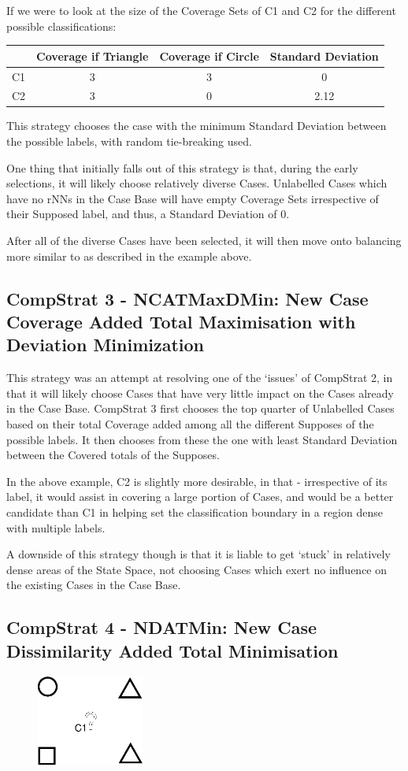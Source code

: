 \documentclass[a4paper,11pt]{report}
\begin{document}
If we were to look at the size of the Coverage Sets of C1 and C2 for the different possible classifications:

\begin{tabular}{|c|c|c|c|}
\cline{2-4} 
\multicolumn{1}{c|}{} & Coverage if Triangle & Coverage if Circle & Standard Deviation\tabularnewline
\hline 
C1 & 3 & 3 & 0\tabularnewline
\hline 
C2 & 3 & 0 & 2.12\tabularnewline
\hline 
\end{tabular}

\vspace{10pt}

This strategy chooses the case with the minimum Standard Deviation between the possible labels, with random tie-breaking used.

One thing that initially falls out of this strategy is that, during the early selections, it will likely choose relatively diverse Cases. Unlabelled Cases which have no rNNs in the Case Base will have empty Coverage Sets irrespective of their Supposed label, and thus, a Standard Deviation of 0.

After all of the diverse Cases have been selected, it will then move onto balancing more similar to as described in the example above.

\subsection{CompStrat 3 - NCATMaxDMin: New Case Coverage Added Total Maximisation with Deviation Minimization}
This strategy was an attempt at resolving one of the `issues' of CompStrat 2, in that it will likely choose Cases that have very little impact on the Cases already in the Case Base.  CompStrat 3 first chooses the top quarter of Unlabelled Cases based on their total Coverage added among all the different Supposes of the possible labels. It then chooses from these the one with least Standard Deviation between the Covered totals of the Supposes.

In the above example, C2 is slightly more desirable, in that - irrespective of its label, it would assist in covering a large portion of Cases, and would be a better candidate than C1 in helping set the classification boundary in a region dense with multiple labels.

A downside of this strategy though is that it is liable to get `stuck' in relatively dense areas of the State Space, not choosing Cases which exert no influence on the existing Cases in the Case Base.

\subsection{CompStrat 4 - NDATMin: New Case Dissimilarity Added Total Minimisation}
\begin{figure}[h!] \centering
\includegraphics[width=100pt]{./Drawn/NDATMin}
\end{figure}
\end{document}
